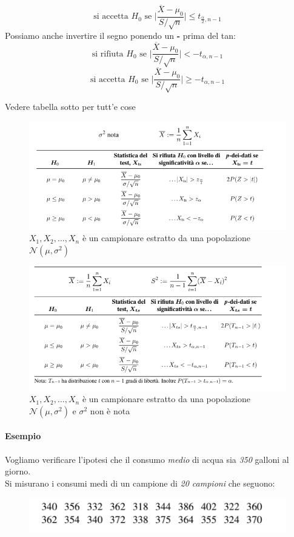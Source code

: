 \documentclass[]{article}
\begin{document}
    \[ \text{si accetta } H_0 \text{ se } \big| \frac{\overline{X} - \mu_0}{S / \sqrt{n}} \big| \leq t_{\frac{\alpha}{2}, n-1} \]
    Possiamo anche invertire il segno ponendo un \textbf{-} prima del tan:
    \[ \text{si rifiuta } H_0 \text{ se } \big| \frac{\overline{X} - \mu_0}{S / \sqrt{n}} \big| < - t_{\alpha, n-1} \]
    \[ \text{si accetta } H_0 \text{ se } \big| \frac{\overline{X} - \mu_0}{S / \sqrt{n}} \big| \geq - t_{\alpha, n-1} \]
    \centerline{Vedere tabella sotto per tutt'e cose}
    \begin{figure}[H]
        \caption{$X_1, X_2, \ldots, X_n$ è un campionare estratto da una popolazione $\mathcal{N}(\mu, \sigma^2)$}
        \includegraphics[width=\textwidth]{images/boh_7.png}
    \end{figure}
    \begin{figure}[H]
        \caption{$X_1, X_2, \ldots, X_n$ è un campionare estratto da una popolazione $\mathcal{N}(\mu, \sigma^2)$ e $\sigma^2$ non è nota}
        \includegraphics[width=\textwidth]{images/boh_9.png}
    \end{figure}
    \paragraph{Esempio} Vogliamo verificare l'ipotesi che il consumo \textit{medio} di acqua sia \textit{350} galloni al giorno. \\
    Si misurano i consumi medi di un campione di \textit{20 campioni} che seguono:
    \begin{figure}[H]
        \includegraphics[width=\textwidth]{images/boh_8.png}
    \end{figure}
\end{document}
